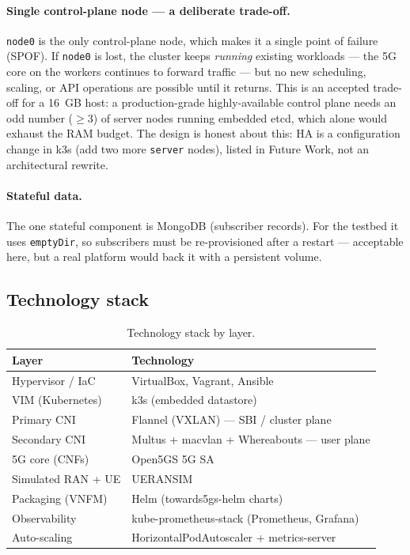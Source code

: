 \paragraph{Single control-plane node --- a deliberate trade-off.}
\texttt{node0} is the only control-plane node, which makes it a single point of
failure (SPOF). If \texttt{node0} is lost, the cluster keeps \emph{running}
existing workloads --- the 5G core on the workers continues to forward
traffic --- but no new scheduling, scaling, or API operations are possible
until it returns. This is an accepted trade-off for a 16~GB host: a
production-grade highly-available control plane needs an odd number
($\geq 3$) of server nodes running embedded etcd, which alone would exhaust the
RAM budget. The design is honest about this: HA is a configuration change in
k3s (add two more \texttt{server} nodes), listed in Future Work, not an
architectural rewrite.

\paragraph{Stateful data.} The one stateful component is MongoDB (subscriber
records). For the testbed it uses \texttt{emptyDir}, so subscribers must be
re-provisioned after a restart --- acceptable here, but a real platform would
back it with a persistent volume.

\subsection{Technology stack}

\begin{table}[H]
\centering
\begin{tabular}{ll}
\toprule
\textbf{Layer} & \textbf{Technology} \\
\midrule
Hypervisor / IaC        & VirtualBox, Vagrant, Ansible \\
VIM (Kubernetes)        & k3s (embedded datastore) \\
Primary CNI             & Flannel (VXLAN) --- SBI / cluster plane \\
Secondary CNI           & Multus + macvlan + Whereabouts --- user plane \\
5G core (CNFs)          & Open5GS 5G SA \\
Simulated RAN + UE      & UERANSIM \\
Packaging (VNFM)        & Helm (towards5gs-helm charts) \\
Observability           & kube-prometheus-stack (Prometheus, Grafana) \\
Auto-scaling            & HorizontalPodAutoscaler + metrics-server \\
\bottomrule
\end{tabular}
\caption{Technology stack by layer.}
\label{tab:stack}
\end{table}

